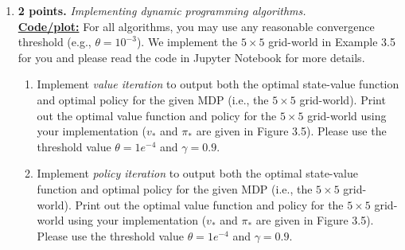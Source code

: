 \documentclass{article}
\begin{document}
\begin{enumerate}
\begin{enumerate}
	      \end{enumerate}

	\item \textbf{2 points.} \textit{Implementing dynamic programming algorithms.} \\
	      \uline{\textbf{Code/plot:}}
	      For all algorithms, you may use any reasonable convergence threshold (e.g., $\theta = 10^{-3}$). We implement the $5 \times 5$ grid-world in Example 3.5 for you and please read the code in Jupyter Notebook for more details.
	      \begin{enumerate}
		      \item Implement \textit{value iteration} to output both the optimal state-value function and optimal policy for the given MDP (i.e., the $5 \times 5$ grid-world). Print out the optimal value function and policy for the $5 \times 5$ grid-world using your implementation ($v_*$ and $\pi_*$ are given in Figure 3.5). Please use the threshold value $\theta=1e^{-4}$ and $\gamma = 0.9$.
		      \item Implement \textit{policy iteration} to output both the optimal state-value function and optimal policy for the given MDP (i.e., the $5 \times 5$ grid-world). Print out the optimal value function and policy for the $5 \times 5$ grid-world using your implementation ($v_*$ and $\pi_*$ are given in Figure 3.5). Please use the threshold value $\theta=1e^{-4}$ and $\gamma = 0.9$.
	      \end{enumerate}


\end{enumerate}
\end{document}
